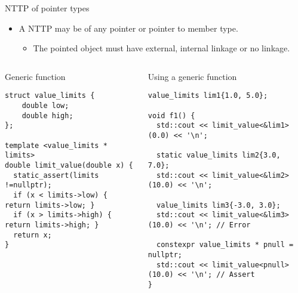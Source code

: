 \begin{frame}[t,fragile]{NTTP of pointer types}
\begin{itemize}
  \item A NTTP may be of any pointer or pointer to member type.
    \begin{itemize}
      \item The pointed object must have external, internal linkage or no linkage.
    \end{itemize}
\end{itemize}

\begin{columns}[T]

\begin{block}{Generic function}
\begin{lstlisting}
struct value_limits {
    double low;
    double high;
};

template <value_limits * limits>
double limit_value(double x) {
  static_assert(limits !=nullptr);
  if (x < limits->low) { return limits->low; }
  if (x > limits->high) { return limits->high; }
  return x;
}
\end{lstlisting}
\end{block}

\pause
{}
\begin{block}{Using a generic function}
\begin{lstlisting}[basicstyle=\tiny]
value_limits lim1{1.0, 5.0};

void f1() {
  std::cout << limit_value<&lim1>(0.0) << '\n';

  static value_limits lim2{3.0, 7.0};
  std::cout << limit_value<&lim2>(10.0) << '\n';

  value_limits lim3{-3.0, 3.0};
  std::cout << limit_value<&lim3>(10.0) << '\n'; // Error

  constexpr value_limits * pnull = nullptr;
  std::cout << limit_value<pnull>(10.0) << '\n'; // Assert
}

\end{lstlisting}
\end{block}

\end{columns}
\end{frame}

